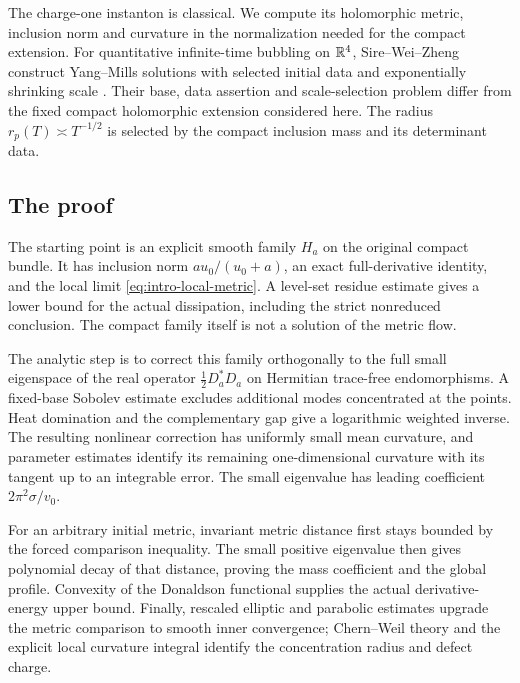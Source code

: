 The charge-one instanton is classical. We compute
its holomorphic metric, inclusion norm and
curvature in the normalization needed for the
compact extension. For quantitative infinite-time
bubbling on \(\mathbb R^4\), Sire--Wei--Zheng construct
Yang--Mills solutions with selected initial
data and exponentially shrinking scale
\cite[Theorem~1]{SireWeiZheng26}.
Their base, data assertion and scale-selection
problem differ from the fixed compact holomorphic
extension considered here. The radius
\(r_p(T)\asymp T^{-1/2}\) is selected by the
compact inclusion mass and its determinant data.

\subsection{The proof}

The starting point is an explicit smooth family
\(H_a\) on the original compact bundle. It has
inclusion norm \(au_0/(u_0+a)\), an exact
full-derivative identity, and the local limit
\eqref{eq:intro-local-metric}. A level-set residue
estimate gives a lower bound for the actual
dissipation, including the strict nonreduced
conclusion. The compact family itself is not
a solution of the metric flow.

The analytic step is to correct this family
orthogonally to the full small eigenspace of
the real operator \(\frac12D_a^*D_a\) on
Hermitian trace-free endomorphisms. A fixed-base
Sobolev estimate excludes additional modes
concentrated at the points. Heat domination
and the complementary gap give a logarithmic
weighted inverse. The resulting nonlinear
correction has uniformly small mean curvature,
and parameter estimates identify its remaining
one-dimensional curvature with its tangent
up to an integrable error. The small eigenvalue
has leading coefficient \(2\pi^2\sigma/v_0\).

For an arbitrary initial metric, invariant
metric distance first stays bounded by the
forced comparison inequality. The small positive
eigenvalue then gives polynomial decay of that
distance, proving the mass coefficient and the
global profile. Convexity of the Donaldson
functional supplies the actual derivative-energy
upper bound. Finally, rescaled elliptic and
parabolic estimates upgrade the metric comparison
to smooth inner convergence; Chern--Weil theory
and the explicit local curvature integral
identify the concentration radius and defect charge.
